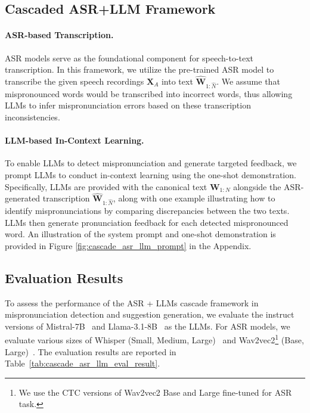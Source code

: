 \documentclass[11pt]{article}
\begin{document}
\subsection{Cascaded ASR+LLM Framework}
\paragraph{ASR-based Transcription.} ASR models serve as the foundational component for speech-to-text transcription. In this framework, we utilize the pre-trained ASR model to transcribe the given speech recordings $\boldsymbol{X}_{A}$ into text $\hat{\boldsymbol{W}}_{1:\hat{N}}$. We assume that mispronounced words would be transcribed into incorrect words, thus allowing LLMs to infer mispronunciation errors based on these transcription inconsistencies.  

\paragraph{LLM-based In-Context Learning.} To enable LLMs to detect mispronunciation and generate targeted feedback, we prompt LLMs to conduct in-context learning using the one-shot demonstration. Specifically, LLMs are provided with the canonical text $\boldsymbol{W}_{1:N}$ alongside the ASR-generated transcription $\hat{\boldsymbol{W}}_{1:\hat{N}}$, along with one example illustrating how to identify mispronunciations by comparing discrepancies between the two texts. LLMs then generate pronunciation feedback for each detected mispronounced word. An illustration of the system prompt and one-shot demonstration is provided in Figure \ref{fig:cascade_asr_llm_prompt} in the Appendix.




\subsection{Evaluation Results} 

To assess the performance of the ASR + LLMs cascade framework in mispronunciation detection and suggestion generation, we evaluate the instruct versions of Mistral-7B~\cite{mistral} and Llama-3.1-8B~\cite{llama3} as the LLMs. For ASR models, we evaluate various sizes of Whisper (Small, Medium, Large)~\cite{whisper} and Wav2vec2\footnote{We use the CTC versions of Wav2vec2 Base and Large fine-tuned for ASR task.} (Base, Large)~\cite{wav2vec2}. The evaluation results are reported in Table~\ref{tab:cascade_asr_llm_eval_result}. 
\end{document}
